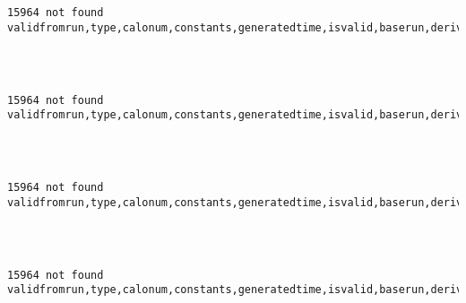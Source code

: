 \documentclass[8pt]{article}
\begin{document}
    \begin{Verbatim}[commandchars=\\\{\}]
15964 not found validfromrun,type,calonum,constants,generatedtime,isvalid,baserun,derivedsubrun


    \end{Verbatim}

    \begin{center}
    \end{center}
    { \hspace*{\fill} \\}
    
    \begin{Verbatim}[commandchars=\\\{\}]
15964 not found validfromrun,type,calonum,constants,generatedtime,isvalid,baserun,derivedsubrun


    \end{Verbatim}

    \begin{center}
    \end{center}
    { \hspace*{\fill} \\}
    
    \begin{Verbatim}[commandchars=\\\{\}]
15964 not found validfromrun,type,calonum,constants,generatedtime,isvalid,baserun,derivedsubrun


    \end{Verbatim}

    \begin{center}
    \end{center}
    { \hspace*{\fill} \\}
    
    \begin{Verbatim}[commandchars=\\\{\}]
15964 not found validfromrun,type,calonum,constants,generatedtime,isvalid,baserun,derivedsubrun


    \end{Verbatim}

    \begin{center}
    \end{center}
    { \hspace*{\fill} \\}
    
\end{document}
